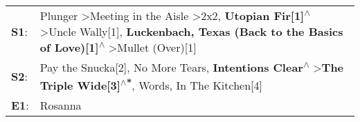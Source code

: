 \begin{supertabular}{p{0.03\textwidth}p{0.92\textwidth}}
 \textbf{S1}:  &  Plunger\textsuperscript{} \textgreater \enspace Meeting in the Aisle\textsuperscript{} \textgreater \enspace 2x2\textsuperscript{}, \enspace \textbf{Utopian Fir[1]\textsuperscript{$\wedge$}} \textgreater \enspace Uncle Wally[1]\textsuperscript{}, \enspace \textbf{Luckenbach, Texas (Back to the Basics of Love)[1]\textsuperscript{$\wedge$}} \textgreater \enspace Mullet (Over)[1]\textsuperscript{}  \enspace  \\
 \textbf{S2}:  &                                                                                                       Pay the Snucka[2]\textsuperscript{}, \enspace No More Tears\textsuperscript{}, \enspace \textbf{Intentions Clear\textsuperscript{$\wedge$}} \textgreater \enspace \textbf{The Triple Wide[3]\textsuperscript{$\wedge$*}}, \enspace Words\textsuperscript{}, \enspace In The Kitchen[4]\textsuperscript{}  \enspace  \\
 \textbf{E1}:  &                                                                                                                                                                                                                                                                                                                                                                                      Rosanna\textsuperscript{}  \enspace  \\
\end{supertabular}
